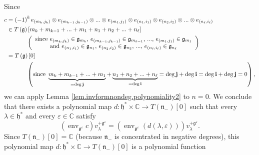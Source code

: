 \documentclass
[numbers=enddot,12pt,final,onecolumn,german,notitlepage]{scrartcl}%
\theoremstyle{definition}
\begin{document}
Since
\begin{align*}
c  &  =\left(  -1\right)  ^{k}e_{\left(  m_{k},j_{k}\right)  }\otimes
e_{\left(  m_{k-1},j_{k-1}\right)  }\otimes...\otimes e_{\left(  m_{1}%
,j_{1}\right)  }\otimes e_{\left(  n_{1},i_{1}\right)  }\otimes e_{\left(
n_{2},i_{2}\right)  }\otimes...\otimes e_{\left(  n_{\ell},i_{\ell}\right)
}\\
&  \in T\left(  \mathfrak{g}\right)  \left[  m_{k}+m_{k-1}+...+m_{1}%
+n_{1}+n_{2}+...+n_{\ell}\right] \\
&  \ \ \ \ \ \ \ \ \ \ \left(
\begin{array}
[c]{c}%
\text{since }e_{\left(  m_{k},j_{k}\right)  }\in\mathfrak{g}_{m_{k}}\text{,
}e_{\left(  m_{k-1},j_{k-1}\right)  }\in\mathfrak{g}_{m_{k-1}}\text{,
}...\text{, }e_{\left(  m_{1},j_{1}\right)  }\in\mathfrak{g}_{m_{1}}\\
\text{and }e_{\left(  n_{1},i_{1}\right)  }\in\mathfrak{g}_{n_{1}}\text{,
}e_{\left(  n_{2},i_{2}\right)  }\in\mathfrak{g}_{n_{2}}\text{, }...\text{,
}e_{\left(  n_{\ell},i_{\ell}\right)  }\in\mathfrak{g}_{n_{\ell}}%
\end{array}
\right) \\
&  =T\left(  \mathfrak{g}\right)  \left[  0\right] \\
&  \ \ \ \ \ \ \ \ \ \ \left(  \text{since }\underbrace{m_{k}+m_{k-1}%
+...+m_{1}}_{=\deg\mathbf{j}}+\underbrace{n_{1}+n_{2}+...+n_{\ell}}%
_{=\deg\mathbf{i}}=\deg\mathbf{j}+\deg\mathbf{i}=\deg\mathbf{i}+\deg
\mathbf{j}=0\right)  ,
\end{align*}
we can apply Lemma \ref{lem.invformnondeg.polynomiality2} to $n=0$. We
conclude that there exists a polynomial map $d:\mathfrak{h}^{\ast}%
\times\mathbb{C}\rightarrow T\left(  \mathfrak{n}_{-}\right)  \left[
0\right]  $ such that every $\lambda\in\mathfrak{h}^{\ast}$ and every
$\varepsilon\in\mathbb{C}$ satisfy%
\begin{equation}
\left(  \operatorname*{env}\nolimits_{\mathfrak{g}^{\varepsilon}}c\right)
v_{\lambda}^{+\mathfrak{g}^{\varepsilon}}=\left(  \operatorname*{env}%
\nolimits_{\mathfrak{g}^{\varepsilon}}\left(  d\left(  \lambda,\varepsilon
\right)  \right)  \right)  v_{\lambda}^{+\mathfrak{g}^{\varepsilon}}.
\label{pf.invformnondeg.polynomiality.4}%
\end{equation}
Since $T\left(  \mathfrak{n}_{-}\right)  \left[  0\right]  =\mathbb{C}$
(because $\mathfrak{n}_{-}$ is concentrated in negative degrees), this
polynomial map $d:\mathfrak{h}^{\ast}\times\mathbb{C}\rightarrow T\left(
\mathfrak{n}_{-}\right)  \left[  0\right]  $ is a polynomial function
\end{document}
